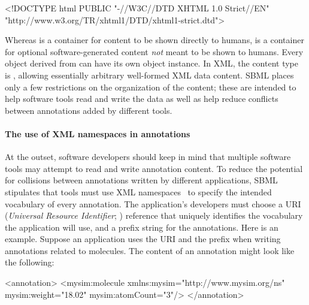 \begin{example}
<!DOCTYPE html PUBLIC "-//W3C//DTD XHTML 1.0 Strict//EN"
 "http://www.w3.org/TR/xhtml1/DTD/xhtml1-strict.dtd">
\end{example}


\label{sec:annotation-use}
\label{sec:annotations}

Whereas \Notes is a container for content to be shown directly to
humans, \Annotation is a container for optional software-generated
content \emph{not} meant to be shown to humans.  Every object
derived from \SBase can have its own \Annotation object instance.
In XML, the \Annotation content type is , allowing
essentially arbitrary well-formed XML data content.  SBML places
only a few restrictions on the organization of the content; these
are intended to help software tools read and write the data as
well as help reduce conflicts between annotations added by
different tools.


\paragraph{The use of XML namespaces in annotations}


At the outset, software developers should keep in mind that
multiple software tools may attempt to read and write annotation
content.  To reduce the potential for collisions between
annotations written by different applications, SBML \thisLV
stipulates that tools must use XML namespaces~\citep{bray:1999} to
specify the intended vocabulary of every annotation.    The
application's developers must choose a URI (\emph{Universal
  Resource Identifier}; \citealt{harold:2001,w3c:2000}) reference
that uniquely identifies the vocabulary the application will use,
and a prefix string for the annotations.  Here is an example.
Suppose an application uses the URI 
and the prefix  when writing annotations related to 
molecules.  The content of an annotation might look like the
following:

\begin{example}
<annotation>
    <mysim:molecule xmlns:mysim="http://www.mysim.org/ns"
         mysim:weight="18.02" mysim:atomCount="3"/>
</annotation>
\end{example}

